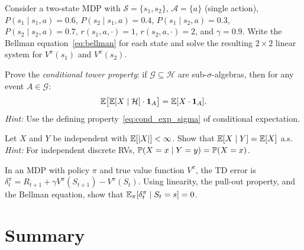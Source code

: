 \documentclass[11pt,a4paper]{article}
\begin{document}
\begin{exercise}
\label{ex:bellman_two_state}
Consider a two-state MDP with
$\mathcal{S} = \{s_1, s_2\}$,
$\mathcal{A} = \{a\}$ (single action),
$P(s_1 \mid s_1, a) = 0.6$,
$P(s_2 \mid s_1, a) = 0.4$,
$P(s_1 \mid s_2, a) = 0.3$,
$P(s_2 \mid s_2, a) = 0.7$,
$r(s_1, a, \cdot) = 1$, $r(s_2, a, \cdot) = 2$, and
$\gamma = 0.9$.
Write the Bellman equation~\eqref{eq:bellman} for each state
and solve the resulting $2 \times 2$ linear system for
$V^\pi(s_1)$ and $V^\pi(s_2)$.
\end{exercise}

\begin{exercise}
\label{ex:tower_conditional}
Prove the \emph{conditional tower property}: if
$\mathcal{G} \subseteq \mathcal{H}$ are sub-$\sigma$-algebras,
then for any event $A \in \mathcal{G}$:
\[
  \mathbb{E}\bigl[\mathbb{E}[X \mid \mathcal{H}] \cdot \mathbf{1}_A\bigr]
  = \mathbb{E}[X \cdot \mathbf{1}_A].
\]
\textit{Hint:} Use the defining
property~\eqref{eq:cond_exp_sigma} of conditional expectation.
\end{exercise}

\begin{exercise}
\label{ex:cond_exp_constant}
Let $X$ and $Y$ be independent with $\mathbb{E}[|X|] < \infty$.
Show that $\mathbb{E}[X \mid Y] = \mathbb{E}[X]$ a.s.
\textit{Hint:} For independent discrete RVs,
$\mathbb{P}(X = x \mid Y = y) = \mathbb{P}(X = x)$.
\end{exercise}

\begin{exercise}
\label{ex:td_error_zero_mean}
In an MDP with policy $\pi$ and true value function $V^\pi$,
the TD error is $\delta_t^\pi = R_{t+1} + \gamma V^\pi(S_{t+1})
- V^\pi(S_t)$.  Using linearity, the pull-out property, and the
Bellman equation, show that
$\mathbb{E}_\pi[\delta_t^\pi \mid S_t = s] = 0$.
\end{exercise}


\section{Summary}
\label{sec:summary}
\end{document}
